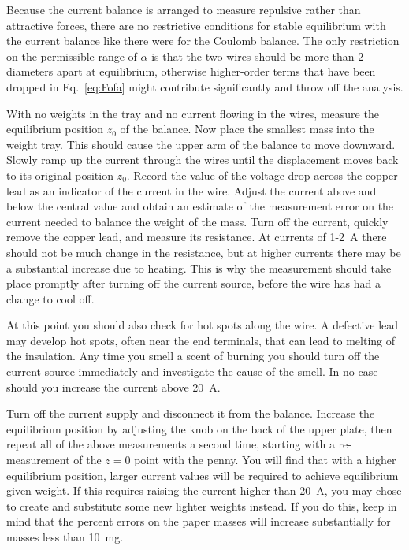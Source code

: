 \documentclass{revtex4}
\begin{document}
Because the current balance is arranged to measure repulsive rather than
attractive forces, there are no restrictive conditions for stable
equilibrium with the current balance like there were for the Coulomb
balance.  The only restriction on the permissible range of $\alpha$
is that the two wires should be more than 2 diameters apart at equilibrium,
otherwise higher-order terms that have been dropped in Eq.~\ref{eq:Fofa}
might contribute significantly and throw off the analysis.

With no weights in the tray and no current flowing in the wires, measure
the equilibrium position $z_0$ of the balance.  Now place the smallest mass
into the weight tray.  This should cause the upper arm of the balance to
move downward.  Slowly ramp up the current through the wires until the
displacement moves back to its original position $z_0$.  Record the value
of the voltage drop across the copper lead as an indicator of the current
in the wire.  Adjust the current above and below the central value and
obtain an estimate of the measurement error on the current needed to
balance the weight of the mass.  Turn off the current, quickly remove
the copper lead, and measure its resistance.  At currents of 1-2~A there
should not be much change in the resistance, but at higher currents there
may be a substantial increase due to heating.  This is why the measurement
should take place promptly after turning off the current source, before the
wire has had a change to cool off.

At this point you should also check for
hot spots along the wire.  A defective lead may develop hot spots, often
near the end terminals, that can lead to melting of the insulation.  Any
time you smell a scent of burning you should turn off the current source
immediately and investigate the cause of the smell.  In no case should
you increase the current above 20~A.

Turn off the current supply and disconnect it from the balance.
Increase the equilibrium position by adjusting the knob on the back of
the upper plate, then repeat all of the above measurements a second time,
starting with a re-measurement of the $z=0$ point with the penny.  You will
find that with a higher equilibrium position, larger current values
will be required to achieve equilibrium given weight.  If this requires
raising the current higher than 20~A, 
you may chose to create and substitute some new lighter
weights instead.  If you do this, keep in mind that the percent errors on
the paper masses will increase substantially for masses less than 10~mg.
\end{document}
